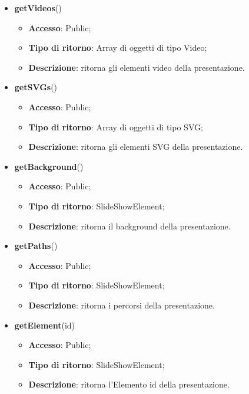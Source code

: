 {\begin{itemize}
\begin{itemize}
				\item \textbf{Descrizione}: ritorna gli elementi audio della presentazione.
			\end{itemize}
			\item \textbf{getVideos}()
			\begin{itemize}
				\item \textbf{Accesso}: Public;
				\item \textbf{Tipo di ritorno}: Array di oggetti di tipo Video;
				\item \textbf{Descrizione}: ritorna gli elementi video della presentazione.
			\end{itemize}
			\item \textbf{getSVGs}()
			\begin{itemize}
				\item \textbf{Accesso}: Public;
				\item \textbf{Tipo di ritorno}: Array di oggetti di tipo SVG;
				\item \textbf{Descrizione}: ritorna gli elementi SVG della presentazione.
			\end{itemize}
			\item \textbf{getBackground}()
			\begin{itemize}
				\item \textbf{Accesso}: Public;
				\item \textbf{Tipo di ritorno}: SlideShowElement;
				\item \textbf{Descrizione}: ritorna il background della presentazione.
			\end{itemize}
			\item \textbf{getPaths}()
			\begin{itemize}
				\item \textbf{Accesso}: Public;
				\item \textbf{Tipo di ritorno}: SlideShowElement;
				\item \textbf{Descrizione}: ritorna i percorsi della presentazione.
			\end{itemize}
			\item \textbf{getElement}(id)
			\begin{itemize}
				\item \textbf{Accesso}: Public;
				\item \textbf{Tipo di ritorno}: SlideShowElement;
				\item \textbf{Descrizione}: ritorna l'Elemento id della presentazione.
			\end{itemize}

\end{itemize}}
